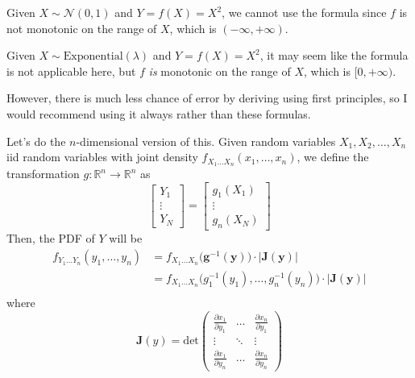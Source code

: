 \documentclass{article}
\begin{document}
      \begin{example}
        Given $X \sim \mathcal{N}(0, 1)$ and $Y = f(X) = X^2$, we cannot use the formula since $f$ is not monotonic on the range of $X$, which is $(-\infty, +\infty)$.  
      \end{example}

      \begin{example}
        Given $X \sim \mathrm{Exponential}(\lambda)$ and $Y = f(X) = X^2$, it may seem like the formula is not applicable here, but $f$ \textit{is} monotonic on the range of $X$, which is $[0, + \infty)$. 
      \end{example}

      However, there is much less chance of error by deriving using first principles, so I would recommend using it always rather than these formulas. 

      Let's do the $n$-dimensional version of this. Given random variables $X_1, X_2, \ldots, X_n$ iid random variables with joint density $f_{X_1 \ldots X_n} (x_1, \ldots, x_n)$, we define the transformation $g: \mathbb{R}^n \rightarrow \mathbb{R}^n$ as 
      \begin{equation}
        \begin{bmatrix} Y_1 \\ \vdots \\ Y_N \end{bmatrix} = \begin{bmatrix} g_1 (X_1) \\ \vdots \\ g_n (X_N) \end{bmatrix}
      \end{equation}
      Then, the PDF of $Y$ will be 
      \begin{align*}
        f_{Y_1 \ldots Y_n} (y_1, \ldots, y_n) & = f_{X_1 \ldots X_n} \big( \mathbf{g}^{-1} (\mathbf{y}) \big) \cdot | \mathbf{J}(\mathbf{y})| \\
        & = f_{X_1 \ldots X_n} \big( g_1^{-1}(y_1), \ldots, g_n^{-1} (y_n) \big) \cdot | \mathbf{J}(\mathbf{y})| \\
      \end{align*}
      where 
      \begin{equation}
        \mathbf{J}(y) = \mathrm{det}\begin{pmatrix} 
        \frac{\partial x_1}{\partial y_1} & \ldots & \frac{\partial x_n}{\partial y_1} \\
        \vdots & \ddots & \vdots \\ 
        \frac{\partial x_1}{\partial y_n} & \ldots & \frac{\partial x_n}{\partial y_n} \end{pmatrix}
      \end{equation}
\end{document}
